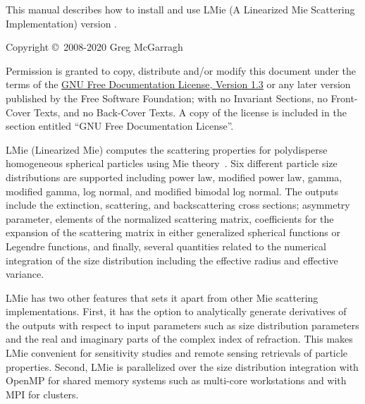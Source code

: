 %
\null
\iftth
\vspace{0.25in}
\else
\vfill
\fi
{
\setlength{\parskip}{7.5pt}

\noindent
This manual describes how to install and use LMie (A Linearized Mie Scattering Implementation) version \version.

\noindent
Copyright \copyright \ 2008-2020 Greg McGarragh

\noindent
Permission is granted to copy, distribute and/or modify this document under the terms of the \href{http://www.gnu.org/licenses/fdl-1.3.html}{GNU Free Documentation License, Version 1.3} or any later version published by the Free Software Foundation; with no Invariant Sections, no Front-Cover Texts, and no Back-Cover Texts.  A copy of the license is included in the section entitled ``GNU Free Documentation License''.
}


\tableofcontents


%
\mainmatter


\setlength{\parskip}{5.0pt}


\label{introduction_to_lmie}

LMie (Linearized Mie) computes the scattering properties for polydisperse homogeneous spherical particles using Mie theory~\citep{mie_gustav_1908}.  Six different particle size distributions are supported including power law, modified power law, gamma, modified gamma, log normal, and modified bimodal log normal.  The outputs include the extinction, scattering, and backscattering cross sections; asymmetry parameter, elements of the normalized scattering matrix, coefficients for the expansion of the scattering matrix in either generalized spherical functions or Legendre functions, and finally, several quantities related to the numerical integration of the size distribution including the effective radius and effective variance.  

LMie has two other features that sets it apart from other Mie scattering implementations.  First, it has the option to analytically generate derivatives of the outputs with respect to input parameters such as size distribution parameters and the real and imaginary parts of the complex index of refraction.  This makes LMie convenient for sensitivity studies and remote sensing retrievals of particle properties.  Second, LMie is parallelized over the size distribution integration with OpenMP for shared memory systems such as multi-core workstations and with MPI for clusters.

